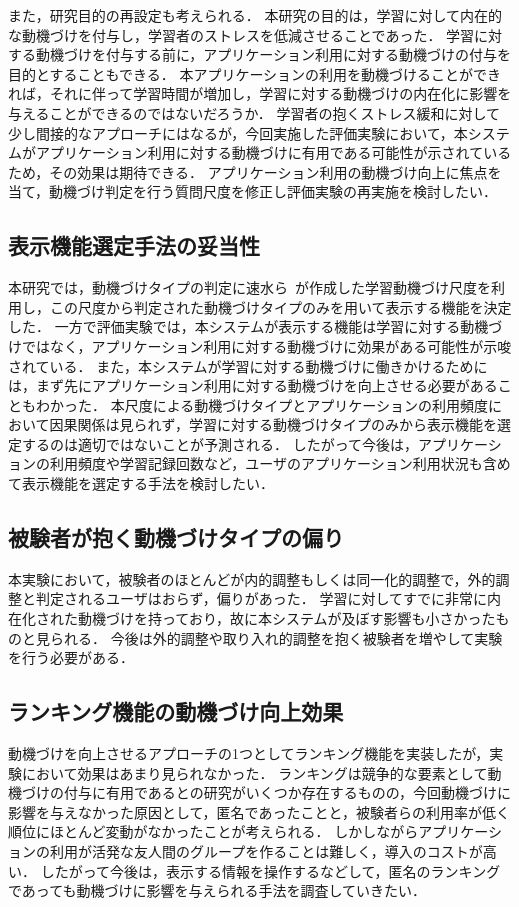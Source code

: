 また，研究目的の再設定も考えられる．
本研究の目的は，学習に対して内在的な動機づけを付与し，学習者のストレスを低減させることであった．
学習に対する動機づけを付与する前に，アプリケーション利用に対する動機づけの付与を目的とすることもできる．
本アプリケーションの利用を動機づけることができれば，それに伴って学習時間が増加し，学習に対する動機づけの内在化に影響を与えることができるのではないだろうか．
学習者の抱くストレス緩和に対して少し間接的なアプローチにはなるが，今回実施した評価実験において，本システムがアプリケーション利用に対する動機づけに有用である可能性が示されているため，その効果は期待できる．
アプリケーション利用の動機づけ向上に焦点を当て，動機づけ判定を行う質問尺度を修正し評価実験の再実施を検討したい．

\subsection{表示機能選定手法の妥当性}
本研究では，動機づけタイプの判定に速水ら~\cite{hayamizu}が作成した学習動機づけ尺度を利用し，この尺度から判定された動機づけタイプのみを用いて表示する機能を決定した．
一方で評価実験では，本システムが表示する機能は学習に対する動機づけではなく，アプリケーション利用に対する動機づけに効果がある可能性が示唆されている．
また，本システムが学習に対する動機づけに働きかけるためには，まず先にアプリケーション利用に対する動機づけを向上させる必要があることもわかった．
本尺度による動機づけタイプとアプリケーションの利用頻度において因果関係は見られず，学習に対する動機づけタイプのみから表示機能を選定するのは適切ではないことが予測される．
したがって今後は，アプリケーションの利用頻度や学習記録回数など，ユーザのアプリケーション利用状況も含めて表示機能を選定する手法を検討したい．

\subsection{被験者が抱く動機づけタイプの偏り}
本実験において，被験者のほとんどが内的調整もしくは同一化的調整で，外的調整と判定されるユーザはおらず，偏りがあった．
学習に対してすでに非常に内在化された動機づけを持っており，故に本システムが及ぼす影響も小さかったものと見られる．
今後は外的調整や取り入れ的調整を抱く被験者を増やして実験を行う必要がある．

\subsection{ランキング機能の動機づけ向上効果}
動機づけを向上させるアプローチの1つとしてランキング機能を実装したが，実験において効果はあまり見られなかった．
ランキングは競争的な要素として動機づけの付与に有用であるとの研究がいくつか存在するものの，今回動機づけに影響を与えなかった原因として，匿名であったことと，被験者らの利用率が低く順位にほとんど変動がなかったことが考えられる．
しかしながらアプリケーションの利用が活発な友人間のグループを作ることは難しく，導入のコストが高い．
したがって今後は，表示する情報を操作するなどして，匿名のランキングであっても動機づけに影響を与えられる手法を調査していきたい．

